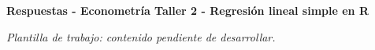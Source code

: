 \documentclass{article}
\begin{document}
{\LARGE\bfseries\color{azul}Respuestas - Econometría Taller 2 - Regresión lineal simple en R\par}
\vspace{1em}
\textit{Plantilla de trabajo: contenido pendiente de desarrollar.}
\end{document}
